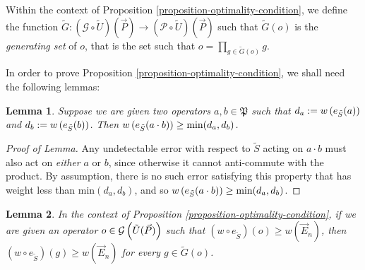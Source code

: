 \documentclass[twocolumn,showpacs,preprintnumbers,amsmath,amssymb,nofootinbib,pra,floatfix]{revtex4-1}
\newtheorem{lemma}{Lemma}
\newenvironment{definition}[1][Definition]{\begin{trivlist}
\item[\hskip \labelsep {\bfseries #1}]}{\end{trivlist}}
\newcommand{\lst}{\vec}
\newcommand{\set}{\tilde}
\newcommand{\genfun}{\mathcal{G}}
\newcommand{\pauligroup}{\mathfrak{P}}
\newcommand{\powerset}{\mathcal{P}}
\begin{document}
\begin{definition}
Within the context of Proposition \ref{proposition-optimality-condition}, we define the function $\set G:(\genfun\circ\set U)(\lst P)\to(\powerset\circ\set U)(\lst P)$ such that $\set G(o)$ is the \emph{generating set} of $o$, that is the set such that $o=\prod_{g\in\set G(o)} g$.
\end{definition}
In order to prove Proposition \ref{proposition-optimality-condition}, we shall need the following lemmas:
\begin{lemma}
Suppose we are given two operators $a,b\in\pauligroup$ such that $d_a:=w\paren{e_{\set S}(a)}$ and $d_b:=w\paren{e_{\set S}(b)}$.  Then $w\paren{e_{\set S}(a\cdot b)} \ge \text{min}(d_a,d_b)$.
\end{lemma}

\begin{proof}[Proof of Lemma]
Any undetectable error with respect to $\set S$ acting on $a\cdot b$ must also act on \emph{either} $a$ or $b$, since otherwise it cannot anti-commute with the product.  By assumption, there is no such error satisfying this property that has weight less than $\text{min}(d_a,d_b)$, and so $w\paren{e_{\set S}(a\cdot b)} \ge \text{min}(d_a,d_b)$.
\end{proof}
\begin{lemma}
In the context of Proposition \ref{proposition-optimality-condition}, if we are given an operator $o\in \genfun\paren{\set U(\lst P)}$ such that $(w\circ e_{\set S})(o)\ge w(\lst E_n)$, then $(w\circ e_{\set S})(g)\ge w(\lst E_n)$ for every $g\in\set G(o)$.
\end{lemma}
\end{document}
